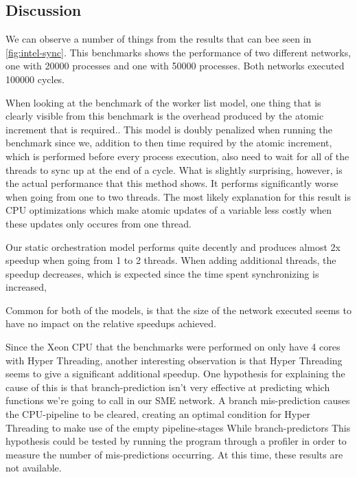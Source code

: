 \subsection{Discussion}
We can observe a number of things from the results that can bee seen
in \cref{fig:intel-sync}.  This benchmarks shows the performance of
two different networks, one with 20000 processes and one with 50000
processes. Both networks executed 100000 cycles.

When looking at the benchmark of the worker list model, one thing that
is clearly visible from this benchmark is the overhead produced by the
atomic increment that is required.. This model is doubly penalized
when running the benchmark since we, addition to then time required by
the atomic increment, which is performed before every process
execution, also need to wait for all of the threads to sync
up at the end of a cycle. What is slightly surprising, however, is the
actual performance that this method shows. It performs significantly
worse when going from one to two threads. The most likely explanation
for this result is CPU optimizations which make atomic updates of a
variable less costly when these updates only occures from one thread.

Our static orchestration model performs quite decently and produces
almost 2x speedup when going from 1 to 2 threads. When adding
additional threads, the speedup decreases, which is expected since the
time spent synchronizing is increased,


Common for both of the models, is that the size of the network
executed seems to have no impact on the relative speedups achieved.

Since the Xeon CPU that the benchmarks were performed on only have 4
cores with Hyper Threading, another interesting observation is that
Hyper Threading seems to give a significant additional speedup. One
hypothesis for explaining the cause of this is that branch-prediction
isn't very effective at predicting which functions we're going to call
in our SME network. A branch mis-prediction causes the CPU-pipeline to
be cleared, creating an optimal condition for Hyper Threading to make
use of the empty pipeline-stages\cite{fog2014microarchitecture} While
branch-predictors This hypothesis could be tested by running the
program through a profiler in order to measure the number of
mis-predictions occurring. At this time, these results are not
available.

